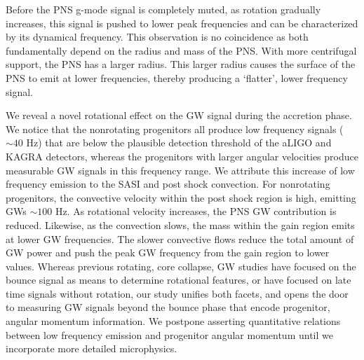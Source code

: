 \documentclass[twocolumn,times]{aastex62}  %
\begin{document}
Before the PNS g-mode signal is completely muted, as rotation gradually increases, this signal is pushed to lower peak frequencies and can be characterized by its dynamical frequency.  This observation is no coincidence as both  fundamentally depend on the radius and mass of the PNS.  With more centrifugal support, the PNS has a larger radius.  This larger radius causes the surface of the PNS to emit at lower frequencies, thereby producing a `flatter', lower frequency signal.

We reveal a novel rotational effect on the GW signal during the accretion phase.  We notice that the nonrotating progenitors all produce low frequency signals ($\sim 40$ Hz) that are below the plausible detection threshold of the aLIGO and KAGRA detectors, whereas the progenitors with larger angular velocities produce measurable GW signals in this frequency range.  We attribute this increase of low frequency emission to the SASI and post shock convection.  For nonrotating progenitors, the convective velocity within the post shock region is high, emitting GWs $\sim 100$ Hz.  As rotational velocity increases, the PNS GW contribution is reduced.  Likewise, as the convection slows, the mass within the gain region emits at lower GW frequencies.  The slower convective flows reduce the total amount of GW power and push the peak GW frequency from the gain region to lower values.  Whereas previous rotating, core collapse, GW studies have focused on the bounce signal as means to determine rotational features, or have focused on late time signals without rotation, our study unifies both facets, and opens the door to measuring GW signals beyond the bounce phase that encode progenitor, angular momentum information. 
We postpone asserting quantitative relations between low frequency emission and progenitor angular momentum until we incorporate more detailed microphysics.

\end{document}
